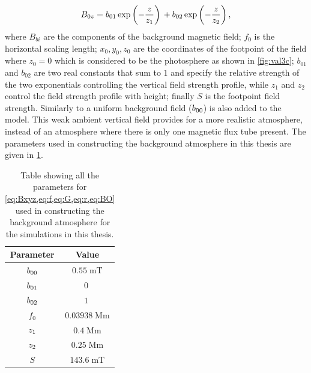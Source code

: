 \documentclass[a4paper,12pt,fourier,authoryear,custommargin]{Classes/PhDThesisPSnPDF}
\begin{document}
\begin{equation}\label{eq:BO}
{B_{0z}} = 
{b_{01}}\exp\left(-\frac{z}{{z_{1}}}\right)\,
+
{b_{02}}\exp\left(-\frac{z}{{z_{2}}}\right),
\end{equation}
where $B_{bi}$ are the components of the background magnetic field; $f_0$ is the horizontal scaling length; $x_0,y_0,z_0$ are the coordinates of the footpoint of the field where $z_0=0$ which is considered to be the photosphere as shown in \cref{fig:val3c}; $b_{01}$ and $b_{02}$ are two real constants that sum to $1$ and specify the relative strength of the two exponentials controlling the vertical field strength profile, while $z_1$ and $z_2$ control the field strength profile with height; finally $S$ is the footpoint field strength.
Similarly to \cite{gent2014} a uniform background field (${b_{00}}$) is also added to the model.
This weak ambient vertical field provides for a more realistic atmosphere, instead of an atmosphere where there is only one magnetic flux tube present.
The parameters used in constructing the background atmosphere in this thesis are given in \cref{tab:bgparams}.

\begin{table}
    \centering
    \begin{tabular}{|c|c|}
        \hline Parameter & Value \\ 
        \hline ${b_{00}}$ & $0.55 \; \mathrm{mT}$
\\ 
        \hline ${b_{01}}$ & $0 \; \mathrm{}$
\\ 
        \hline ${b_{02}}$ & $1 \; \mathrm{}$
\\ 
        \hline $f_0$ & $0.03938 \; \mathrm{Mm}$
\\ 
        \hline ${z_{1}}$ & $0.4 \; \mathrm{Mm}$
\\ 
        \hline ${z_{2}}$ & $0.25 \; \mathrm{Mm}$
\\
        \hline $S$   & $143.6 \; \mathrm{mT}$
\\
        \hline
    \end{tabular}
    
    \caption{Table showing all the parameters for \cref{eq:Bxyz,eq:f,eq:G,eq:r,eq:BO} used in constructing the background atmosphere for the simulations in this thesis.}
    \label{tab:bgparams}
\end{table}
\end{document}
